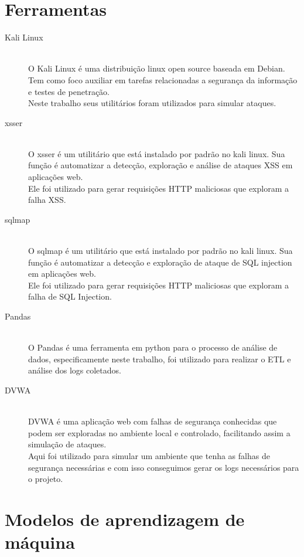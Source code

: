 \section{Ferramentas}

\begin{description}
    \item[Kali Linux] \hfill \\ 
        O Kali Linux é uma distribuição linux open source baseada em Debian. 
        Tem como foco auxiliar em tarefas relacionadas a segurança da informação 
        e testes de penetração. \\
        Neste trabalho seus utilitários foram utilizados para simular ataques.
    \item[xsser] \hfill \\ 
        O xsser é um utilitário que está instalado por padrão no kali linux. Sua 
        função é automatizar a detecção, exploração e análise de ataques XSS em 
        aplicações web. \\
        Ele foi utilizado para gerar requisições HTTP maliciosas que exploram a falha
        XSS.
    \item[sqlmap] \hfill \\ 
        O sqlmap é um utilitário que está instalado por padrão no kali linux. Sua
        função é automatizar a detecção e exploração de ataque de SQL injection em 
        aplicações web. \\
        Ele foi utilizado para gerar requisições HTTP maliciosas que exploram a falha
        de SQL Injection.
    \item[Pandas] \hfill \\ 
        O Pandas é uma ferramenta  em python para o processo de análise de dados, 
        especificamente neste trabalho, foi utilizado para realizar o ETL e análise 
        dos logs coletados.
    \item[DVWA] \hfill \\ 
        DVWA é uma aplicação web com falhas de segurança conhecidas que podem ser 
        exploradas no ambiente local e controlado, facilitando assim a simulação de
        ataques. \\ 
        Aqui foi utilizado para simular um ambiente que tenha as falhas de segurança 
        necessárias e com isso conseguimos gerar os logs necessários para o projeto.
  \end{description}

\section{Modelos de aprendizagem de máquina}

